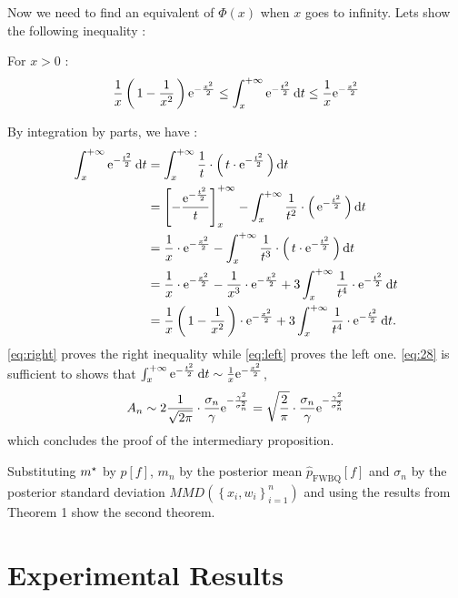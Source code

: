 Now we need to find an equivalent of $\Phi(x)$ when $x$ goes to infinity. Lets show the following inequality :
\begin{boxtheorem}
For $x>0$ :
\begin{equation}
  \label{eq:28}
  \frac{1}{x} \left( \, 1-\frac{1}{x^2} \, \right) \mathrm{e}^{-\frac{x^2}{2}}
  \leq \int_{x}^{+\infty} \mathrm{e}^{-\frac{t^2}{2}} \mathop{}\mathopen{}\mathrm{d}{}t
  \leq   \frac{1}{x}  \mathrm{e}^{-\frac{x^2}{2}}
\end{equation}
\end{boxtheorem}

\noindent
By integration by parts, we have :
\begin{align}
  \int_{x}^{+\infty} \mathrm{e}^{-\frac{t^2}{2}} \mathop{}\mathopen{}\mathrm{d}{}t &=
  \int_{x}^{+\infty} \frac{1}{t} \cdot \left( \, t\cdot \mathrm{e}^{-\frac{t^2}{2}} \, \right) \mathop{}\mathopen{}\mathrm{d}{}t \nonumber\\
  &= \left[ - \frac{\mathrm{e}^{-\frac{t^2}{2}}}{t} \right]_{x}^{+\infty}-
  \int_{x}^{+\infty} \frac{1}{t^2} \cdot \left( \, \mathrm{e}^{-\frac{t^2}{2}} \, \right) \mathop{}\mathopen{}\mathrm{d}{}t \nonumber\\
  &= \frac{1}{x}\cdot \mathrm{e}^{-\frac{x^2}{2}}- \int_{x}^{+\infty} \frac{1}{t^3} \cdot \left( \, t\cdot \mathrm{e}^{-\frac{t^2}{2}} \, \right) \mathop{}\mathopen{}\mathrm{d}{}t \label{eq:right}\\
  &= \frac{1}{x}\cdot \mathrm{e}^{-\frac{x^2}{2}} - \frac{1}{x^3}\cdot \mathrm{e}^{-\frac{x^2}{2}}
  + 3\int_{x}^{+\infty} \frac{1}{t^4} \cdot \mathrm{e}^{-\frac{t^2}{2}} \mathop{}\mathopen{}\mathrm{d}{}t \nonumber\\
  &= \frac{1}{x} \left( \, 1-\frac{1}{x^2} \, \right) \cdot \mathrm{e}^{-\frac{x^2}{2}} + 3\int_{x}^{+\infty} \frac{1}{t^4} \cdot \mathrm{e}^{-\frac{t^2}{2}} \mathop{}\mathopen{}\mathrm{d}{}t.\label{eq:left}
\end{align}
\noindent
\eqref{eq:right} proves the right inequality while \eqref{eq:left} proves the left one.
\noindent
\eqref{eq:28} is sufficient to shows that $\int_{x}^{+\infty} \mathrm{e}^{-\frac{t^2}{2}} \mathop{}\mathopen{}\mathrm{d}{}t \sim \frac{1}{x}  \mathrm{e}^{-\frac{x^2}{2}}$, \ie
\begin{equation*}
A_n \sim 2 \frac{1}{\sqrt{2\pi}} \cdot \frac{\sigma_n}{\gamma} \mathrm{e}^{-\frac{\gamma^2}{\sigma_n^2}}= \sqrt{\frac{2}{\pi}}\cdot \frac{\sigma_n}{\gamma} \mathrm{e}^{-\frac{\gamma^2}{\sigma_n^2}}
\end{equation*}
\noindent
which concludes the proof of the intermediary proposition.

\noindent
Substituting $\mopt$ by $p[f]$, $m_n$ by the posterior mean $\hat { p } _ { \mathrm { FWBQ } } [ f ]$ and $\sigma_n$ by the posterior standard deviation $M M D \left( \left\{ x _ { i } , w _ { i } \right\} _ { i = 1 } ^ { n } \right)$ and using the results
 from Theorem 1 show the second theorem.

\section{Experimental Results}
\label{sec:ER}

